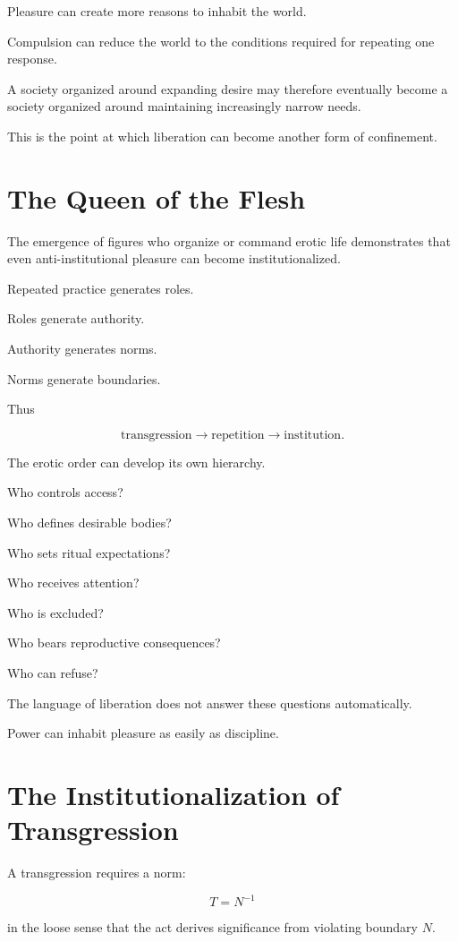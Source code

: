 \documentclass[11pt,oneside]{book}
\theoremstyle{definition}
\theoremstyle{remark}
\begin{document}
Pleasure can create more reasons to inhabit the world.

Compulsion can reduce the world to the conditions required for repeating one response.

A society organized around expanding desire may therefore eventually become a society organized around maintaining increasingly narrow needs.

This is the point at which liberation can become another form of confinement.

\section{The Queen of the Flesh}

The emergence of figures who organize or command erotic life demonstrates that even anti-institutional pleasure can become institutionalized.

Repeated practice generates roles.

Roles generate authority.

Authority generates norms.

Norms generate boundaries.

Thus

\[
\text{transgression}
\rightarrow
\text{repetition}
\rightarrow
\text{institution}.
\]

The erotic order can develop its own hierarchy.

Who controls access?

Who defines desirable bodies?

Who sets ritual expectations?

Who receives attention?

Who is excluded?

Who bears reproductive consequences?

Who can refuse?

The language of liberation does not answer these questions automatically.

Power can inhabit pleasure as easily as discipline.

\section{The Institutionalization of Transgression}

A transgression requires a norm:

\[
T=N^{-1}
\]

in the loose sense that the act derives significance from violating boundary \(N\).
\end{document}
